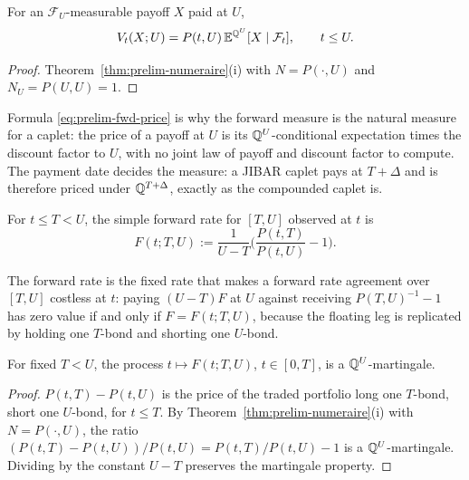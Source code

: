 \documentclass[../../../main.tex]{subfiles}
\begin{document}
\begin{corollary}\label{cor:prelim-forward-pricing}
For an $\mathcal F_U$-measurable payoff $X$ paid at $U$,
\begin{equation}\label{eq:prelim-fwd-price}
V_t(X;U)=P(t,U)\,\mathbb{E}^{\mathbb{Q}^{U}}[X\mid\mathcal F_t],\qquad t\le U .
\end{equation}
\end{corollary}

\begin{proof}
Theorem~\ref{thm:prelim-numeraire}(i) with $N=P(\cdot,U)$ and $N_U=P(U,U)=1$.
\end{proof}

Formula \eqref{eq:prelim-fwd-price} is why the forward measure is the natural measure for a caplet: the price of a payoff at $U$ is its $\mathbb{Q}^{U}$-conditional expectation times the discount factor to $U$, with no joint law of payoff and discount factor to compute. The payment date decides the measure: a JIBAR caplet pays at $T+\Delta$ and is therefore priced under $\mathbb{Q}^{T+\Delta}$, exactly as the compounded caplet is.

\begin{definition}\label{def:prelim-simple-forward}
For $t\le T<U$, the simple forward rate for $[T,U]$ observed at $t$ is
\[
F(t;T,U):=\frac{1}{U-T}\Big(\frac{P(t,T)}{P(t,U)}-1\Big).
\]
\end{definition}

The forward rate is the fixed rate that makes a forward rate agreement over $[T,U]$ costless at $t$: paying $(U-T)F$ at $U$ against receiving $P(T,U)^{-1}-1$ has zero value if and only if $F=F(t;T,U)$, because the floating leg is replicated by holding one $T$-bond and shorting one $U$-bond.

\begin{proposition}\label{prop:prelim-forward-mart}
For fixed $T<U$, the process $t\mapsto F(t;T,U)$, $t\in[0,T]$, is a $\mathbb{Q}^{U}$-martingale.
\end{proposition}

\begin{proof}
$P(t,T)-P(t,U)$ is the price of the traded portfolio long one $T$-bond, short one $U$-bond, for $t\le T$. By Theorem~\ref{thm:prelim-numeraire}(i) with $N=P(\cdot,U)$, the ratio $(P(t,T)-P(t,U))/P(t,U)=P(t,T)/P(t,U)-1$ is a $\mathbb{Q}^{U}$-martingale. Dividing by the constant $U-T$ preserves the martingale property.
\end{proof}
\end{document}
